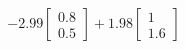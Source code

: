 \documentclass[preview]{standalone}
\begin{document}
\begin{align*}
-2.99 \begin{bmatrix} 0.8 \\ 0.5 \end{bmatrix} + 1.98 \begin{bmatrix} 1 \\ 1.6 \end{bmatrix}
\end{align*}
\end{document}

